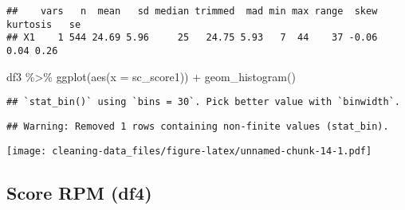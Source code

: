\documentclass[
]{article}
\newenvironment{Shaded}{\begin{snugshade}}{\end{snugshade}}
\newcommand{\AttributeTok}[1]{\textcolor[rgb]{0.77,0.63,0.00}{#1}}
\newcommand{\FunctionTok}[1]{\textcolor[rgb]{0.00,0.00,0.00}{#1}}
\newcommand{\NormalTok}[1]{#1}
\newcommand{\SpecialCharTok}[1]{\textcolor[rgb]{0.00,0.00,0.00}{#1}}
\begin{document}
\begin{Shaded}
\end{Shaded}

\begin{verbatim}
##    vars   n  mean   sd median trimmed  mad min max range  skew kurtosis   se
## X1    1 544 24.69 5.96     25   24.75 5.93   7  44    37 -0.06     0.04 0.26
\end{verbatim}

\begin{Shaded}
\begin{Highlighting}[]
\NormalTok{df3 }\SpecialCharTok{\%\textgreater{}\%} 
  \FunctionTok{ggplot}\NormalTok{(}\FunctionTok{aes}\NormalTok{(}\AttributeTok{x =}\NormalTok{ sc\_score1)) }\SpecialCharTok{+}
  \FunctionTok{geom\_histogram}\NormalTok{()}
\end{Highlighting}
\end{Shaded}

\begin{verbatim}
## `stat_bin()` using `bins = 30`. Pick better value with `binwidth`.
\end{verbatim}

\begin{verbatim}
## Warning: Removed 1 rows containing non-finite values (stat_bin).
\end{verbatim}

\texttt{[image: cleaning-data\_files/figure-latex/unnamed-chunk-14-1.pdf]}

\hypertarget{score-rpm-df4}{%
\subsection{Score RPM (df4)}\label{score-rpm-df4}}
\end{document}
